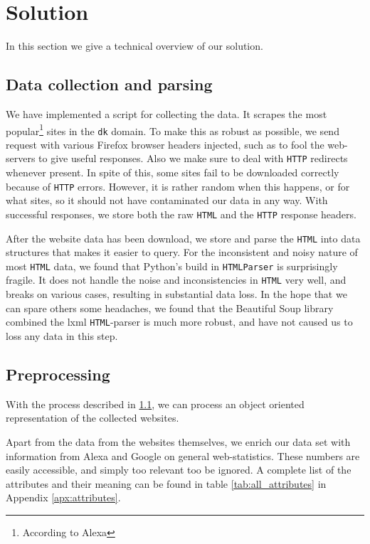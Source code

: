 \section{Solution}
\label{sec:solution}

In this section we give a technical overview of our solution.

\subsection{Data collection and parsing}
\label{subsec:scraping}

We have implemented a script for collecting the data. It scrapes the most popular\footnote{According to Alexa} sites in the \texttt{dk} domain. To make this as robust as possible, we send request with various Firefox browser headers injected, such as to fool the web-servers to give useful responses. Also we make sure to deal with \texttt{HTTP} redirects whenever present. In spite of this, some sites fail to be downloaded correctly because of \texttt{HTTP} errors. However, it is rather random when this happens, or for what sites, so it should not have contaminated our data in any way. With successful responses, we store both the raw \texttt{HTML} and the \texttt{HTTP} response headers.

After the website data has been download, we store and parse the \texttt{HTML} into data structures that makes it easier to query. For the inconsistent and noisy nature of most \texttt{HTML} data, we found that Python's build in \texttt{HTMLParser} is surprisingly fragile. It does not handle the noise and inconsistencies in \texttt{HTML} very well, and breaks on various cases, resulting in substantial data loss. In the hope that we can spare others some headaches, we found that the Beautiful Soup\cite{beautiful_soup} library combined the lxml\cite{lxml} \texttt{HTML}-parser is much more robust, and have not caused us to loss any data in this step.

\subsection{Preprocessing}
\label{subsec:preprocessing}

With the process described in \ref{subsec:scraping}, we can process an object oriented representation of the collected websites.

Apart from the data from the websites themselves, we enrich our data set with information from Alexa and Google on general web-statistics. These numbers are easily accessible, and simply too relevant too be ignored. A complete list of the attributes and their meaning can be found in table \ref{tab:all_attributes} in Appendix \ref{apx:attributes}.

